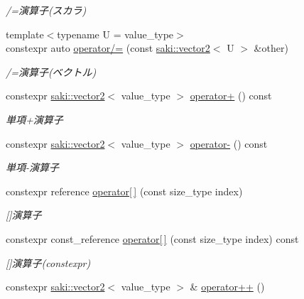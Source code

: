 \begin{DoxyCompactItemize}
\begin{DoxyCompactList}\small\item\em /=演算子(スカラ) \end{DoxyCompactList}\item 
{\footnotesize template$<$typename U  = value\+\_\+type$>$ }\\constexpr auto \mbox{\hyperlink{classsaki_1_1vector2_afd078748b33fd375b943a46057ace9ee}{operator/=}} (const \mbox{\hyperlink{classsaki_1_1vector2}{saki\+::vector2}}$<$ U $>$ \&other)
\begin{DoxyCompactList}\small\item\em /=演算子(ベクトル) \end{DoxyCompactList}\item 
constexpr \mbox{\hyperlink{classsaki_1_1vector2}{saki\+::vector2}}$<$ value\+\_\+type $>$ \mbox{\hyperlink{classsaki_1_1vector2_a860342168e4b74d2b3190d7383c144a5}{operator+}} () const
\begin{DoxyCompactList}\small\item\em 単項+演算子 \end{DoxyCompactList}\item 
constexpr \mbox{\hyperlink{classsaki_1_1vector2}{saki\+::vector2}}$<$ value\+\_\+type $>$ \mbox{\hyperlink{classsaki_1_1vector2_a92def26a2ee843e86295ba3bf5d56d31}{operator-\/}} () const
\begin{DoxyCompactList}\small\item\em 単項-\/演算子 \end{DoxyCompactList}\item 
constexpr reference \mbox{\hyperlink{classsaki_1_1vector2_a6bf127ca7ecdf4bc069bb172a147be1e}{operator\mbox{[}$\,$\mbox{]}}} (const size\+\_\+type index)
\begin{DoxyCompactList}\small\item\em \mbox{[}\mbox{]}演算子 \end{DoxyCompactList}\item 
constexpr const\+\_\+reference \mbox{\hyperlink{classsaki_1_1vector2_a31bc36eae8002f6616026a33bcd4d6f7}{operator\mbox{[}$\,$\mbox{]}}} (const size\+\_\+type index) const
\begin{DoxyCompactList}\small\item\em \mbox{[}\mbox{]}演算子(constexpr) \end{DoxyCompactList}\item 
constexpr \mbox{\hyperlink{classsaki_1_1vector2}{saki\+::vector2}}$<$ value\+\_\+type $>$ \& \mbox{\hyperlink{classsaki_1_1vector2_a47ae623f11d6f9cde6230b0d934bd54e}{operator++}} ()

\end{DoxyCompactItemize}
